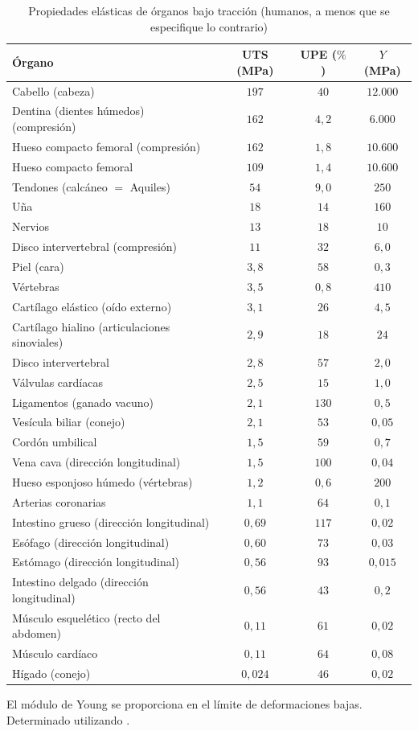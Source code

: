 \documentclass[12pt]{book}
\begin{document}
\begin{table}[htbp]
\centering
\caption{Propiedades elásticas de órganos bajo tracción (humanos, a menos que se especifique lo contrario)}
\label{tab:42}
\begin{tabularx}{\textwidth}{Xccc}
\toprule
\textbf{Órgano} & \textbf{UTS (MPa)} & \textbf{UPE ($\%$)} & \textbf{$Y$ (MPa)} \\
\midrule
Cabello (cabeza) & $197$ & $40$ & $12.000$ \\
Dentina (dientes húmedos) (compresión) & $162$ & $4,2$ & $6.000$ \\
Hueso compacto femoral (compresión) & $162$ & $1,8$ & $10.600$ \\
Hueso compacto femoral & $109$ & $1,4$ & $10.600$ \\
Tendones (calcáneo $=$ Aquiles) & $54$ & $9,0$ & $250$ \\
Uña & $18$ & $14$ & $160$ \\
Nervios & $13$ & $18$ & $10$ \\
Disco intervertebral (compresión) & $11$ & $32$ & $6,0$ \\
Piel (cara) & $3,8$ & $58$ & $0,3$ \\
Vértebras & $3,5$ & $0,8$ & $410$ \\
Cartílago elástico (oído externo) & $3,1$ & $26$ & $4,5$ \\
Cartílago hialino (articulaciones sinoviales) & $2,9$ & $18$ & $24$ \\
Disco intervertebral & $2,8$ & $57$ & $2,0$ \\
Válvulas cardíacas & $2,5$ & $15$ & $1,0$ \\
Ligamentos (ganado vacuno) & $2,1$ & $130$ & $0,5$ \\
Vesícula biliar (conejo) & $2,1$ & $53$ & $0,05$ \\
Cordón umbilical & $1,5$ & $59$ & $0,7$ \\
Vena cava (dirección longitudinal) & $1,5$ & $100$ & $0,04$ \\
Hueso esponjoso húmedo (vértebras) & $1,2$ & $0,6$ & $200$ \\
Arterias coronarias & $1,1$ & $64$ & $0,1$ \\
Intestino grueso (dirección longitudinal) & $0,69$ & $117$ & $0,02$ \\
Esófago (dirección longitudinal) & $0,60$ & $73$ & $0,03$ \\
Estómago (dirección longitudinal) & $0,56$ & $93$ & $0,015$ \\
Intestino delgado (dirección longitudinal) & $0,56$ & $43$ & $0,2$ \\
Músculo esquelético (recto del abdomen) & $0,11$ & $61$ & $0,02$ \\
Músculo cardíaco & $0,11$ & $64$ & $0,08$ \\
Hígado (conejo) & $0,024$ & $46$ & $0,02$ \\
\bottomrule
\end{tabularx}
\begin{flushleft}
    \small El módulo de Young se proporciona en el límite de deformaciones bajas. \\
    Determinado utilizando \cite{79}.
\end{flushleft}
\end{table}
\end{document}
